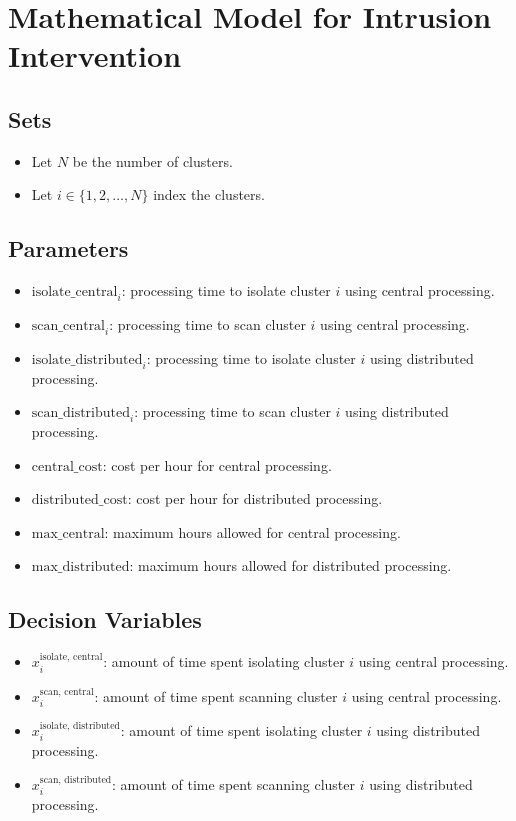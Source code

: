 \documentclass{article}
\begin{document}
\section*{Mathematical Model for Intrusion Intervention}

\subsection*{Sets}
\begin{itemize}
    \item Let \( N \) be the number of clusters.
    \item Let \( i \in \{1, 2, \ldots, N\} \) index the clusters.
\end{itemize}

\subsection*{Parameters}
\begin{itemize}
    \item \( \text{isolate\_central}_{i} \): processing time to isolate cluster \( i \) using central processing.
    \item \( \text{scan\_central}_{i} \): processing time to scan cluster \( i \) using central processing.
    \item \( \text{isolate\_distributed}_{i} \): processing time to isolate cluster \( i \) using distributed processing.
    \item \( \text{scan\_distributed}_{i} \): processing time to scan cluster \( i \) using distributed processing.
    \item \( \text{central\_cost} \): cost per hour for central processing.
    \item \( \text{distributed\_cost} \): cost per hour for distributed processing.
    \item \( \text{max\_central} \): maximum hours allowed for central processing.
    \item \( \text{max\_distributed} \): maximum hours allowed for distributed processing.
\end{itemize}

\subsection*{Decision Variables}
\begin{itemize}
    \item \( x_{i}^{\text{isolate, central}} \): amount of time spent isolating cluster \( i \) using central processing.
    \item \( x_{i}^{\text{scan, central}} \): amount of time spent scanning cluster \( i \) using central processing.
    \item \( x_{i}^{\text{isolate, distributed}} \): amount of time spent isolating cluster \( i \) using distributed processing.
    \item \( x_{i}^{\text{scan, distributed}} \): amount of time spent scanning cluster \( i \) using distributed processing.
\end{itemize}
\end{document}
